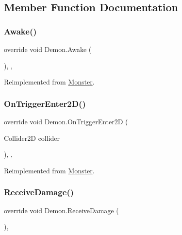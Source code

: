 \subsection{Member Function Documentation}
\mbox{\label{class_demon_a1a87c40897c33f1a752e66807fb53f34}} 
\subsubsection{\texorpdfstring{Awake()}{Awake()}}
{\footnotesize\ttfamily override void Demon.\+Awake (\begin{DoxyParamCaption}{ }\end{DoxyParamCaption})\hspace{0.3cm}{\ttfamily [inline]}, {\ttfamily [protected]}, {\ttfamily [virtual]}}



Reimplemented from \mbox{\hyperlink{class_monster_a3ccbdc33e8e7e6fb20286338ad17c6f2}{Monster}}.

\mbox{\label{class_demon_aa0c85beffd46a97daa76e65bb2388444}} 
\subsubsection{\texorpdfstring{On\+Trigger\+Enter2\+D()}{OnTriggerEnter2D()}}
{\footnotesize\ttfamily override void Demon.\+On\+Trigger\+Enter2D (\begin{DoxyParamCaption}\item[{Collider2D}]{collider }\end{DoxyParamCaption})\hspace{0.3cm}{\ttfamily [inline]}, {\ttfamily [protected]}, {\ttfamily [virtual]}}



Reimplemented from \mbox{\hyperlink{class_monster_af6ac6a4c01088e6b4abf79da772cecff}{Monster}}.

\mbox{\label{class_demon_a90dc4738a3cab182e3daa2da35cbbbc6}} 
\subsubsection{\texorpdfstring{Receive\+Damage()}{ReceiveDamage()}}
{\footnotesize\ttfamily override void Demon.\+Receive\+Damage (\begin{DoxyParamCaption}{ }\end{DoxyParamCaption})\hspace{0.3cm}{\ttfamily [inline]}, {\ttfamily [virtual]}}




